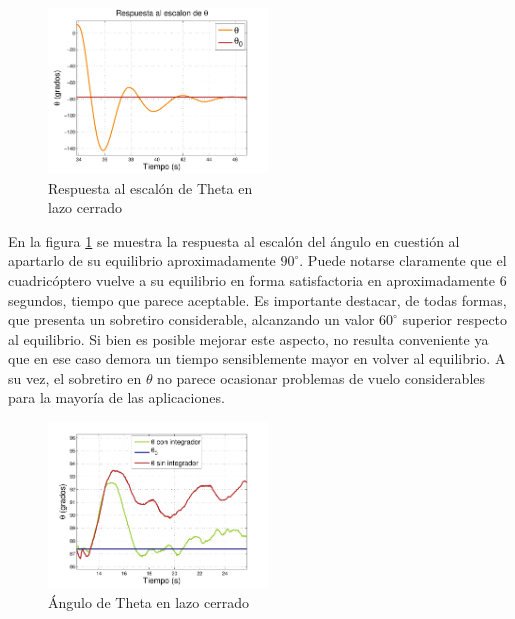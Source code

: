 \documentclass[main]{subfiles}
\begin{document}
\begin{figure}
	\vspace{-10pt}
	\centering
	\includegraphics[width=0.52\textwidth]{./pics_test_control/theta_esc.pdf}
	\caption{Respuesta al escal\'on de Theta en\\ lazo cerrado}
	\label{fig:theta_esc}
\end{figure}

En la figura \ref{fig:theta_esc} se muestra la respuesta al escalón del ángulo en cuestión al apartarlo de su equilibrio aproximadamente $90^\circ$. Puede notarse claramente que el cuadricóptero vuelve a su equilibrio en forma satisfactoria en aproximadamente 6 segundos, tiempo que parece aceptable. Es importante destacar, de todas formas, que presenta un sobretiro considerable, alcanzando un valor $60^\circ$ superior respecto al equilibrio. Si bien es posible mejorar este aspecto, no resulta conveniente ya que en ese caso demora un tiempo sensiblemente mayor en volver al equilibrio. A su vez, el sobretiro en $\theta$ no parece ocasionar problemas de vuelo considerables para la mayoría de las aplicaciones.\\

\begin{figure}
	\centering
	\vspace{-10pt}
	\includegraphics[width=0.52\textwidth]{./pics_test_control/theta_sin_con_int.pdf}
	\caption{\'Angulo de Theta en lazo cerrado}
	\label{fig:theta_sin_con_int}
\end{figure}
\end{document}
